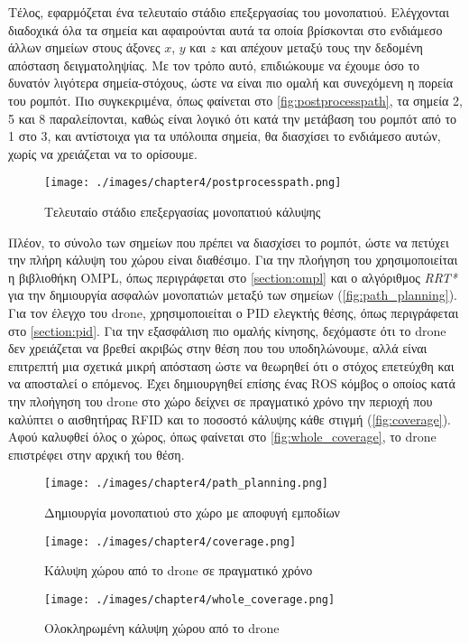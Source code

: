Τέλος, εφαρμόζεται ένα τελευταίο στάδιο επεξεργασίας του μονοπατιού. Ελέγχονται διαδοχικά όλα τα σημεία και αφαιρούνται αυτά τα οποία βρίσκονται στο ενδιάμεσο άλλων σημείων στους άξονες $x$, $y$ και $z$ και απέχουν μεταξύ τους την δεδομένη απόσταση δειγματοληψίας. Με τον τρόπο αυτό, επιδιώκουμε να έχουμε όσο το δυνατόν λιγότερα σημεία-στόχους, ώστε να είναι πιο ομαλή και συνεχόμενη η πορεία του ρομπότ. Πιο συγκεκριμένα, όπως φαίνεται στο \autoref{fig:postprocesspath}, τα σημεία 2, 5 και 8 παραλείπονται, καθώς είναι λογικό ότι κατά την μετάβαση του ρομπότ από το 1 στο 3, και αντίστοιχα για τα υπόλοιπα σημεία, θα διασχίσει το ενδιάμεσο αυτών, χωρίς να χρειάζεται να το ορίσουμε.

\begin{figure}[!h]
    \centering
    \texttt{[image: ./images/chapter4/postprocesspath.png]}
    \caption{Τελευταίο στάδιο επεξεργασίας μονοπατιού κάλυψης}
    \label{fig:postprocesspath}
\end{figure} 

Πλέον, το σύνολο των σημείων που πρέπει να διασχίσει το ρομπότ, ώστε να πετύχει την πλήρη κάλυψη του χώρου είναι διαθέσιμο. Για την πλοήγηση του χρησιμοποιείται η βιβλιοθήκη OMPL, όπως περιγράφεται στο \autoref{section:ompl} και ο αλγόριθμος \emph{RRT*} για την δημιουργία ασφαλών μονοπατιών μεταξύ των σημείων (\autoref{fig:path_planning}). Για τον έλεγχο του drone, χρησιμοποιείται ο PID ελεγκτής θέσης, όπως περιγράφεται στο \autoref{section:pid}. Για την εξασφάλιση πιο ομαλής κίνησης, δεχόμαστε ότι το drone δεν χρειάζεται να βρεθεί ακριβώς στην θέση που του υποδηλώνουμε, αλλά είναι επιτρεπτή μια σχετικά μικρή απόσταση ώστε να θεωρηθεί ότι ο στόχος επετεύχθη και να αποσταλεί ο επόμενος. Έχει δημιουργηθεί επίσης ένας ROS κόμβος ο οποίος κατά την πλοήγηση του drone στο χώρο δείχνει σε πραγματικό χρόνο την περιοχή που καλύπτει ο αισθητήρας RFID και το ποσοστό κάλυψης κάθε στιγμή (\autoref{fig:coverage}). Αφού καλυφθεί όλος ο χώρος, όπως φαίνεται στο \autoref{fig:whole_coverage}, το drone επιστρέφει στην αρχική του θέση.

\begin{figure}[!ht]
    \centering
    \texttt{[image: ./images/chapter4/path\_planning.png]}
    \caption{Δημιουργία μονοπατιού στο χώρο με αποφυγή εμποδίων}
    \label{fig:path_planning}
\end{figure} 

\begin{figure}[!ht]
    \centering
    \texttt{[image: ./images/chapter4/coverage.png]}
    \caption{Κάλυψη χώρου από το drone σε πραγματικό χρόνο}
    \label{fig:coverage}
\end{figure} 

\begin{figure}[!ht]
    \centering
    \texttt{[image: ./images/chapter4/whole\_coverage.png]}
    \caption{Ολοκληρωμένη κάλυψη χώρου από το drone}
    \label{fig:whole_coverage}
\end{figure} 